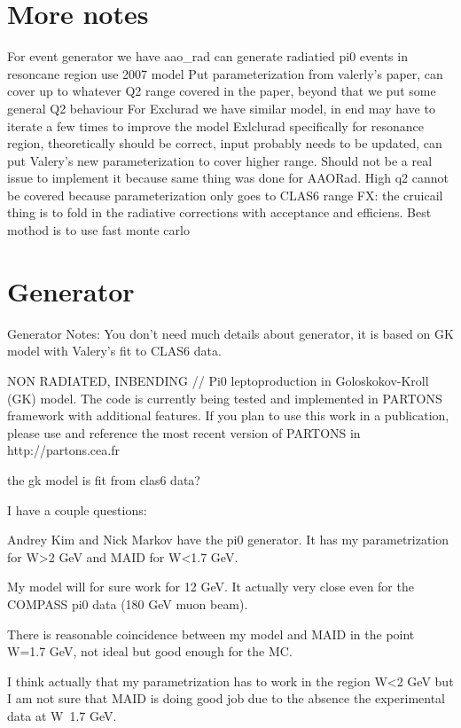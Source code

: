 \section{More notes}
    

    For event generator we have aao\_rad can generate radiatied pi0 events in resoncane region use 2007 model
    Put parameterization from valerly’s paper, can cover up to whatever Q2 range covered in the paper, beyond that we put some general Q2 behaviour
    For Exclurad we have similar model, in end may have to iterate a few times to improve the model
    Exlclurad specifically for resonance region, theoretically should be correct, input probably needs to be updated, can put Valery’s new parameterization to cover higher range. Should not be a real issue to implement it because same thing was done for AAORad. High q2 cannot be covered because parameterization only goes to CLAS6 range
    FX: the cruicail thing is to fold in the radiative corrections with acceptance and efficiens. Best mothod is to use fast monte carlo




\section{Generator}
Generator Notes:
You don't need much details about generator, it is based on GK model with Valery's fit to CLAS6 data.

NON RADIATED, INBENDING
// Pi0 leptoproduction in Goloskokov-Kroll (GK) model. The code is currently being tested and implemented in PARTONS framework with additional features. If you plan to use this work in a publication, please use and reference the most recent version of PARTONS in http://partons.cea.fr 

the gk model is fit from clas6 data?

I have a couple questions:

Andrey Kim and Nick Markov have the pi0 generator. It has my parametrization for W>2 GeV and MAID for W<1.7 GeV.

My model will for sure work for 12 GeV. It actually very close even for the COMPASS pi0 data (180 GeV muon beam).

There is reasonable coincidence between my model and MAID in the point W=1.7 GeV, not ideal but good enough for the MC.

I think actually that my parametrization has to work in the region W<2 GeV but I am not sure that MAID is doing good job due to the absence the experimental data at W~1.7 GeV. 


